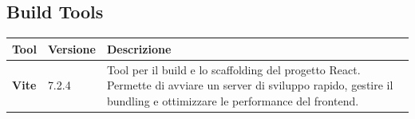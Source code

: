 \documentclass[a4paper,12pt]{article}
\begin{document}
        \subsection{Build Tools}
        \begin{center}
            \begin{tabularx}{\textwidth}{|l|l|X|}
                \hline
                \rowcolor{gold}
                \textbf{Tool}  & \textbf{Versione}  & \textbf{Descrizione}   \\
                \hline
                \textbf{Vite} & 7.2.4 & Tool per il build e lo scaffolding del progetto React. Permette di avviare un server di sviluppo rapido, gestire il bundling e ottimizzare le performance del frontend.\\
                \hline
            \end{tabularx}
        \end{center}
        
\end{document}
